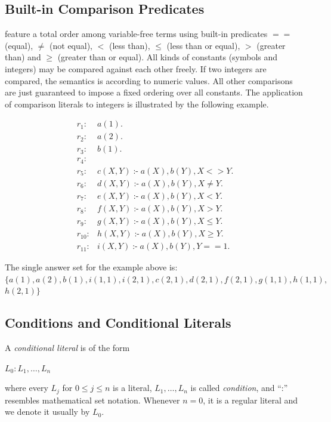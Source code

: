\documentclass[14pt,a4paper, titlepage]{article}
\DeclareMathOperator{\leftimpl}{:-}
\begin{document}
\subsection{Built-in Comparison Predicates}
\dlvhex{} feature a total order among variable-free terms using built-in predicates $==$ (equal), $\neq$ (not equal), $<$ (less than), $\leq$ (less than or equal), $>$ (greater than) and $\geq$ (greater than or equal). All kinds of constants (symbols and integers) may be compared against each other freely. If two integers are compared, the semantics is according to numeric values. All other comparisons are just guaranteed to impose a fixed ordering over all constants. The application of comparison literals to integers is illustrated by the following example.
\begin{exmp}
\begin{align*}
r_1\colon& a(1). \\
r_2\colon& a(2). \\
r_3\colon& b(1). \\
r_4\colon& \\
r_5\colon& c(X,Y) \leftimpl a(X), b(Y), X <> Y. \\
r_6\colon& d(X,Y) \leftimpl a(X), b(Y), X \neq Y. \\
r_7\colon& e(X,Y) \leftimpl a(X), b(Y), X < Y. \\
r_8\colon& f(X,Y) \leftimpl a(X), b(Y), X > Y. \\
r_9\colon& g(X,Y) \leftimpl a(X), b(Y), X \leq Y. \\
r_{10}\colon& h(X,Y) \leftimpl a(X), b(Y), X \geq Y. \\
r_{11}\colon& i(X,Y) \leftimpl a(X), b(Y), Y == 1. 
\end{align*}
\end{exmp}
The single answer set for the example above is:\\ $\mathit{\{a(1),a(2),b(1),i(1,1),i(2,1),c(2,1),d(2,1),f(2,1),g(1,1),h(1,1)},$\\
$\mathit{h(2,1)}\}$

\subsection{Conditions and Conditional Literals}
\label{conditions}
A \emph{conditional literal} is of the form \\ \centerline{$L_0:L_1,\dots,L_n$} where every $\mathit{L_j}$ for $0 \leq j \leq n$ is a literal, $L_1,\dots,L_n$ is called \emph{condition}, and \enquote{:} resembles mathematical set notation. Whenever $\mathit{n = 0}$, it is a regular literal and we denote it usually by $L_0$.
\end{document}
